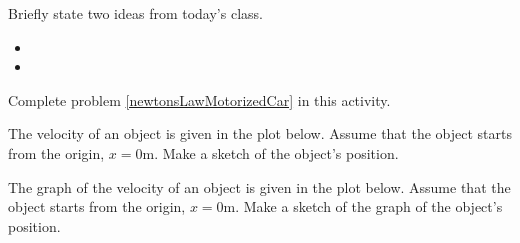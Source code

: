 \postClass

\begin{problem}
\item Briefly state two ideas from today's class.
  \begin{itemize}
  \item
  \item
  \end{itemize}
\item Complete problem \ref{newtonsLawMotorizedCar} in this activity.
\end{problem}




\begin{problem}
\item The velocity of an object is given in the plot below. Assume
  that the object starts from the origin, $x=0$m. Make a sketch of the
  object's position.

  \scalebox{0.7}{}

  \clearpage

\item The graph of the velocity of an object is given in the plot
  below. Assume that the object starts from the origin, $x=0$m. Make a
  sketch of the graph of the object's position.

  \scalebox{0.7}{}

\end{problem}


